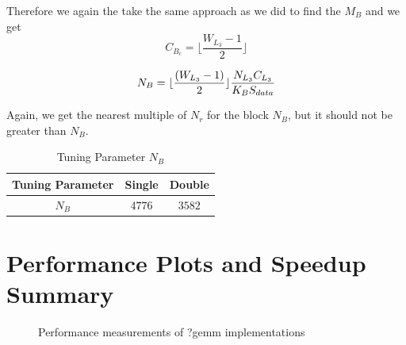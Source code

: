 Therefore we again the take the same approach as we did to find the $M_B$ and we get
\[C_{B_c} = \lfloor \frac{ W_{L_3} - 1 }{2} \rfloor \]

\[
    N_B = \lfloor \frac{(W_{L_3} - 1)}{2} \rfloor \frac{N_{L_3} C_{L_3}}{K_B S_{data}}\\
\]

Again, we get the nearest multiple of $N_r$ for the block $N_B$, but it should not be
greater than $N_B$.

\begin{table}[ht]
    \centering
    \caption{Tuning Parameter $N_B$}
    \begin{tabular}{|c|c|c|}
        \hline
        \textbf{Tuning Parameter} & \textbf{Single} & \textbf{Double}\\
        \hline
        $N_B$   & $4776$ & $3582$ \\
        \hline
    \end{tabular}
\end{table}

\clearpage

\section{Performance Plots and Speedup Summary}

\begin{figure}[htb]
    \centering
    \caption*{Performance measurements of ?gemm implementations}
    \label{fig:mtm_col_Sgflop220}
    \qquad
    \label{fig:mtm_col_Dgflop220}
\end{figure}

